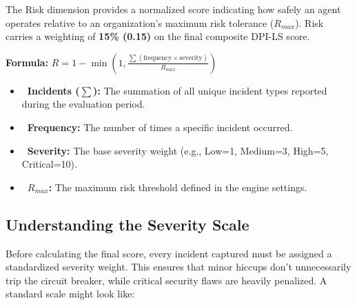 \documentclass[11pt,a4paper]{article}
\begin{document}
The Risk dimension provides a normalized score indicating how safely an agent operates relative to an organization's maximum risk tolerance ($R_{max}$). Risk carries a weighting of \textbf{15\% (0.15)} on the final composite DPI-LS score.

\begin{dpiimportant}
\textbf{Formula:} $R = 1 - \min\left(1, \frac{\sum (\text{frequency} \times \text{severity})}{R_{max}}\right)$
\end{dpiimportant}

\vspace{0.3cm}
\begin{tcolorbox}[enhanced, colback=gray!5!white, colframe=dpiblue, boxrule=1pt, arc=3mm, 
    title={\textbf{\faCalculator\ Formula Variables}}, fonttitle=\bfseries]
\begin{itemize}
    \item \textbf{\color{dpiblue}\faListUl\ Incidents ($\sum$):} The summation of all unique incident types reported during the evaluation period.
    \item \textbf{\color{dpigreen}\faSyncAlt\ Frequency:} The number of times a specific incident occurred.
    \item \textbf{\color{dpired}\faExclamationTriangle\ Severity:} The base severity weight (e.g., Low=1, Medium=3, High=5, Critical=10).
    \item \textbf{\color{dpicloud}\faTachometerAlt\ $R_{max}$:} The maximum risk threshold defined in the engine settings.
\end{itemize}
\end{tcolorbox}
\vspace{0.3cm}

\subsection{Understanding the Severity Scale}

Before calculating the final score, every incident captured must be assigned a standardized severity weight. This ensures that minor hiccups don't unnecessarily trip the circuit breaker, while critical security flaws are heavily penalized. A standard scale might look like:
\end{document}

